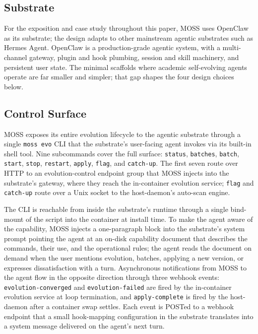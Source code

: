 \documentclass{article}
\begin{document}
\subsection{Substrate}
\label{subsec:substrate}

For the exposition and case study throughout this paper, MOSS uses OpenClaw~\citep{openclaw-github} as its substrate; the design adapts to other mainstream agentic substrates such as Hermes Agent. OpenClaw is a production-grade agentic system, with a multi-channel gateway, plugin and hook plumbing, session and skill machinery, and persistent user state. The minimal scaffolds where academic self-evolving agents operate are far smaller and simpler; that gap shapes the four design choices below.

\subsection{Control Surface}
\label{subsec:control-surface}

MOSS exposes its entire evolution lifecycle to the agentic substrate through a single \texttt{moss evo} CLI that the substrate's user-facing agent invokes via its built-in shell tool. Nine subcommands cover the full surface: \texttt{status}, \texttt{batches}, \texttt{batch}, \texttt{start}, \texttt{stop}, \texttt{restart}, \texttt{apply}, \texttt{flag}, and \texttt{catch-up}. The first seven route over HTTP to an evolution-control endpoint group that MOSS injects into the substrate's gateway, where they reach the in-container evolution service; \texttt{flag} and \texttt{catch-up} route over a Unix socket to the host-daemon's auto-scan engine.

The CLI is reachable from inside the substrate's runtime through a single bind-mount of the script into the container at install time. To make the agent aware of the capability, MOSS injects a one-paragraph block into the substrate's system prompt pointing the agent at an on-disk capability document that describes the commands, their use, and the operational rules; the agent reads the document on demand when the user mentions evolution, batches, applying a new version, or expresses dissatisfaction with a turn. Asynchronous notifications from MOSS to the agent flow in the opposite direction through three webhook events: \texttt{evolution-converged} and \texttt{evolution-failed} are fired by the in-container evolution service at loop termination, and \texttt{apply-complete} is fired by the host-daemon after a container swap settles. Each event is POSTed to a webhook endpoint that a small hook-mapping configuration in the substrate translates into a system message delivered on the agent's next turn.
\end{document}
